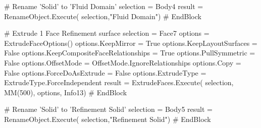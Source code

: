 # Rename 'Solid' to 'Fluid Domain'
selection = Body4
result = RenameObject.Execute(
    selection,"Fluid Domain")
# EndBlock

# Extrude 1 Face Refinement surface
selection = Face7
options = ExtrudeFaceOptions()
options.KeepMirror = True
options.KeepLayoutSurfaces = False
options.KeepCompositeFaceRelationships = True
options.PullSymmetric = False
options.OffsetMode = OffsetMode.IgnoreRelationships
options.Copy = False
options.ForceDoAsExtrude = False
options.ExtrudeType = ExtrudeType.ForceIndependent
result = ExtrudeFaces.Execute(
    selection, MM(500), options, Info13)
# EndBlock

# Rename 'Solid' to 'Refinement Solid'
selection = Body5
result = RenameObject.Execute(
    selection,"Refinement Solid")
# EndBlock